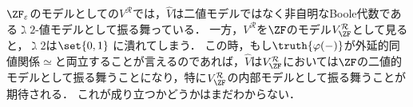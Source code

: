 \documentclass[realisability.tex]{subfiles}
\begin{document}
$\ZFe$のモデルとしての$V^{\mathcal{R}}$では，$\hat{V}$は二値モデルではなく非自明なBoole代数である$\gimel 2$-値モデルとして振る舞っている．
一方，$V^{\mathcal{R}}$を$\ZF$のモデル$V^{\mathcal{R}}_{\ZF}$として見ると，$\gimel 2$は$\set{0, 1}$ に潰れてしまう．
この時，もし$\truth{\varphi(-)}$が外延的同値関係$\simeq$と両立することが言えるのであれば，$\hat{V}$は$V^{\mathcal{R}}_{\ZF}$においては$\ZF$の二値的モデルとして振る舞うことになり，特に$V^{\mathcal{R}}_{\ZF}$の内部モデルとして振る舞うことが期待される．
これが成り立つかどうかはまだわからない．
\nocite{Kamo:2007}
\end{document}
